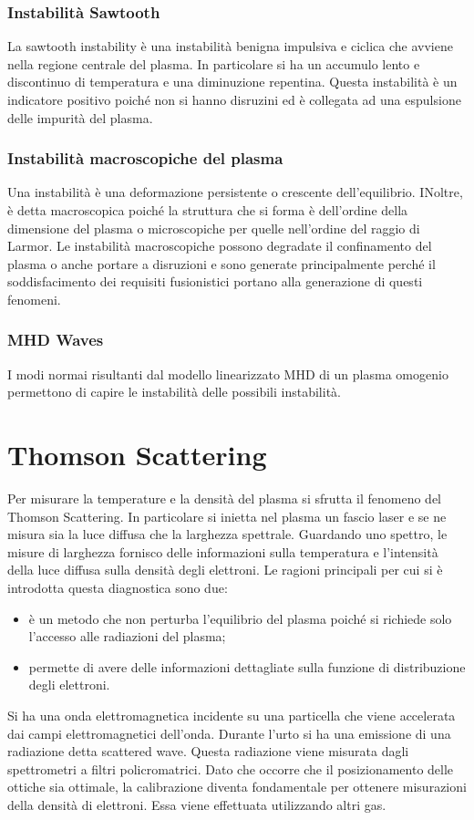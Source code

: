 \documentclass{article}
\begin{document}
\subsubsection{Instabilità Sawtooth}
La sawtooth instability è una instabilità benigna impulsiva e ciclica che avviene nella regione centrale del plasma. In particolare si ha un accumulo lento e discontinuo di temperatura e una diminuzione repentina.\newline
Questa instabilità è un indicatore positivo poiché non si hanno disruzini ed è collegata ad una espulsione delle impurità del plasma.
\subsubsection{Instabilità macroscopiche del plasma}
Una instabilità è una deformazione persistente o crescente dell'equilibrio. INoltre, è detta macroscopica poiché la struttura che si forma è dell'ordine della dimensione del plasma o microscopiche per quelle nell'ordine del raggio di Larmor.\newline
Le instabilità macroscopiche possono degradate il confinamento del plasma o anche portare a disruzioni e sono generate principalmente perché il soddisfacimento dei requisiti fusionistici portano alla generazione di questi fenomeni.
\subsubsection{MHD Waves}
I modi normai risultanti dal modello linearizzato MHD di un plasma omogenio permettono di capire le instabilità delle possibili instabilità.






\section{Thomson Scattering}
Per misurare la temperature e la densità del plasma si sfrutta il fenomeno del Thomson Scattering. In particolare si inietta nel plasma un fascio laser e se ne misura sia la luce diffusa che la larghezza spettrale.\newline
Guardando uno spettro, le misure di larghezza fornisco delle informazioni sulla temperatura e l'intensità della luce diffusa sulla densità degli elettroni. Le ragioni principali per cui si è introdotta questa diagnostica sono due:\begin{itemize}
	\item è un metodo che non perturba l'equilibrio del plasma poiché si richiede solo l'accesso alle radiazioni del plasma;
	\item permette di avere delle informazioni dettagliate sulla funzione di distribuzione degli elettroni.
\end{itemize}
Si ha una onda elettromagnetica incidente su una particella che viene accelerata dai campi elettromagnetici dell'onda. Durante l'urto si ha una emissione di una radiazione detta scattered wave. Questa radiazione viene misurata dagli spettrometri a filtri policromatrici.
Dato che occorre che il posizionamento delle ottiche sia ottimale, la calibrazione diventa fondamentale per ottenere misurazioni della densità di elettroni. Essa viene effettuata utilizzando altri gas.
\end{document}
